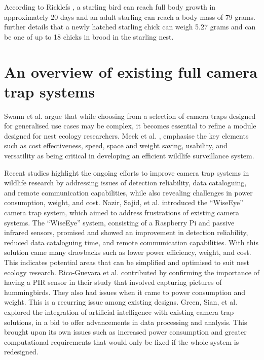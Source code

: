 \documentclass[class=report,11pt,crop=false]{standalone}
\begin{document}
According to Ricklefs \cite{ricklefs1968patterns}, a starling bird can reach full body growth in approximately 20 days and an adult starling can reach a body mass of 79 grams. \cite{ricklefs1968patterns} further details that a newly hatched starling chick can weigh 5.27 grams and can be one of up to 18 chicks in brood in the starling nest. 



\section{An overview of existing full camera trap systems}


Swann et al. \cite{swann2011evaluating} argue that while choosing from a selection of camera traps designed for generalised use cases may be complex, it becomes essential to refine a module designed for nest ecology researchers. Meek et al. \cite{meek2012user}, emphasise the key elements such as cost effectiveness, speed, space and weight saving, usability, and versatility as being critical in developing an efficient wildlife surveillance system.  

Recent studies highlight the ongoing efforts to improve camera trap systems in wildlife research by addressing issues of detection reliability, data cataloguing, and remote communication capabilities, while also revealing challenges in power consumption, weight, and cost. Nazir, Sajid, et al. \cite{nazir2017wiseeye} introduced the “WiseEye” camera trap system, which aimed to address frustrations of existing camera systems. The “WiseEye” system, consisting of a Raspberry Pi and passive infrared sensors, promised and showed an improvement in detection reliability, reduced data cataloguing time, and remote communication capabilities. With this solution came many drawbacks such as lower power efficiency, weight, and cost. This indicates potential areas that can be simplified and optimised to suit nest ecology research. Rico-Guevara et al. \cite{rico-guevara2017bring} contributed by confirming the importance of having a PIR sensor in their study that involved capturing pictures of hummingbirds. They also had issues when it came to power consumption and weight. This is a recurring issue among existing designs. Green, Sian, et al. \cite{green2020innovations} explored the integration of artificial intelligence with existing camera trap solutions, in a bid to offer advancements in data processing and analysis. This brought upon its own issues such as increased power consumption and greater computational requirements that would only be fixed if the whole system is redesigned. 
\end{document}
